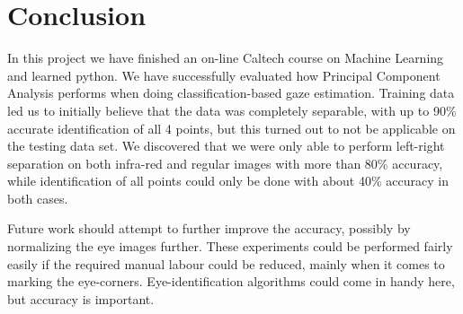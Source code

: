\section{Conclusion}
\label{sec:Conclusion}
In this project we have finished an on-line Caltech course on Machine Learning and learned python.
We have successfully evaluated how Principal Component Analysis performs when doing classification-based gaze estimation.
Training data led us to initially believe that the data was completely separable, with up to 90\% accurate identification of all 4 points, but this turned out to not be applicable on the testing data set.
We discovered that we were only able to perform left-right separation on both infra-red and regular images with more than 80\% accuracy, while identification of all points could only be done with about 40\% accuracy in both cases.

Future work should attempt to further improve the accuracy, possibly by normalizing the eye images further.
These experiments could  be performed fairly easily if the required manual labour could be reduced, mainly when it comes to marking the eye-corners.
Eye-identification algorithms could come in handy here, but accuracy is important.
